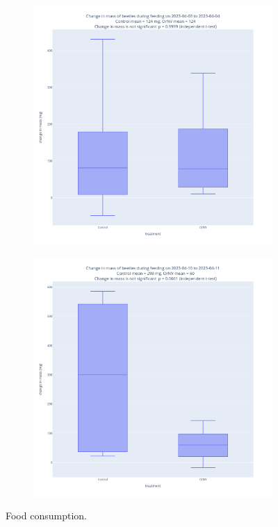 \documentclass[12pt,letterpaper,english,bibliography=totocnumbered, abstract=on]{scrartcl}
\begin{document}
\begin{figure}[H]
\begin{subfigure}{.49\textwidth}
	\end{subfigure}
	\begin{subfigure}{.49\textwidth}
		\includegraphics[width=\textwidth]{images/food_consumption_2023-04-03}
	\end{subfigure}
	\begin{subfigure}{.49\textwidth}
		\includegraphics[width=\textwidth]{images/food_consumption_2023-04-10}
	\end{subfigure}
	\caption{Food consumption.}
	\label{fig:Palau2 food consumption}
\end{figure}
\end{document}
